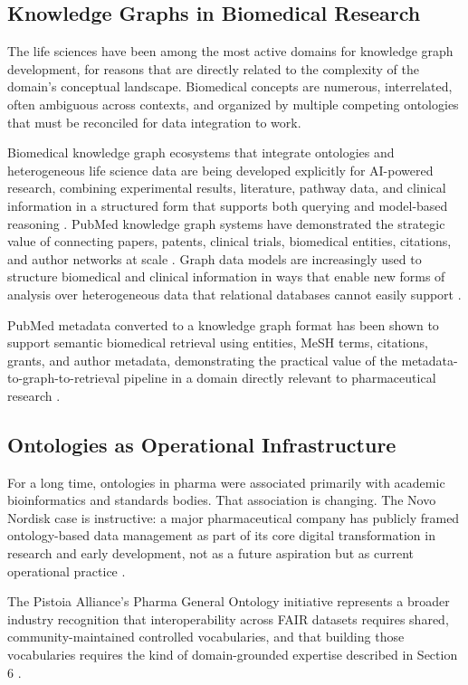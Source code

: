 \documentclass[man,12pt,donotrepeattitle]{apa7}
\begin{document}
\subsection{Knowledge Graphs in Biomedical Research}

The life sciences have been among the most active domains for knowledge
graph development, for reasons that are directly related to the complexity
of the domain's conceptual landscape. Biomedical concepts are numerous,
interrelated, often ambiguous across contexts, and organized by multiple
competing ontologies that must be reconciled for data integration to work.

Biomedical knowledge graph ecosystems that integrate ontologies and
heterogeneous life science data are being developed explicitly for
AI-powered research, combining experimental results, literature, pathway
data, and clinical information in a structured form that supports both
querying and model-based reasoning \parencite{callahan2024}. PubMed
knowledge graph systems have demonstrated the strategic value of connecting
papers, patents, clinical trials, biomedical entities, citations, and author
networks at scale \parencite{xu2025}. Graph data models are increasingly used
to structure biomedical and clinical information in ways that enable new
forms of analysis over heterogeneous data that relational databases cannot
easily support \parencite{hansel2023}.

PubMed metadata converted to a knowledge graph format has been shown to
support semantic biomedical retrieval using entities, MeSH terms, citations,
grants, and author metadata, demonstrating the practical value of the
metadata-to-graph-to-retrieval pipeline in a domain directly relevant to
pharmaceutical research \parencite{ebeid2022}.

\subsection{Ontologies as Operational Infrastructure}

For a long time, ontologies in pharma were associated primarily with
academic bioinformatics and standards bodies. That association is changing.
The Novo Nordisk case is instructive: a major pharmaceutical company has
publicly framed ontology-based data management as part of its core digital
transformation in research and early development, not as a future aspiration
but as current operational practice \parencite{tan2025}.

The Pistoia Alliance's Pharma General Ontology initiative represents a
broader industry recognition that interoperability across FAIR datasets
requires shared, community-maintained controlled vocabularies, and that
building those vocabularies requires the kind of domain-grounded expertise
described in Section 6 \parencite{pistoiaalliance2025}.
\end{document}
